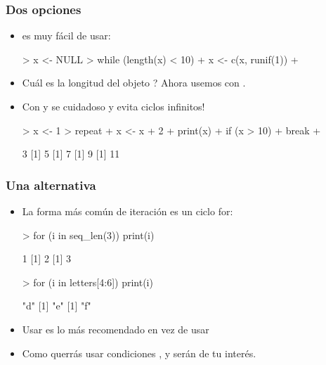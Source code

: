 \begin{frame}
  \frametitle{Dos opciones}
  \begin{itemize}
  \item {} es muy f\'acil de usar: 
\begin{Schunk}
\begin{Sinput}
> x <- NULL
> while (length(x) < 10) {
+     x <- c(x, runif(1))
+ }
\end{Sinput}
\end{Schunk}
  \item \textquestiondown Cu\'al es la longitud del objeto ? Ahora usemos  con .
  \item Con  y  se cuidadoso y evita \alert{ciclos infinitos!}
\begin{Schunk}
\begin{Sinput}
> x <- 1
> repeat {
+     x <- x + 2
+     print(x)
+     if (x > 10) 
+         break
+ }
\end{Sinput}
\begin{Soutput}
[1] 3
[1] 5
[1] 7
[1] 9
[1] 11
\end{Soutput}
\end{Schunk}
  \end{itemize}
\end{frame}

\begin{frame}
  \frametitle{Una alternativa}
  \begin{itemize}
  \item La forma m\'as com\'un de iteraci\'on es un ciclo \alert{for}: 
\begin{Schunk}
\begin{Sinput}
> for (i in seq_len(3)) print(i)
\end{Sinput}
\begin{Soutput}
[1] 1
[1] 2
[1] 3
\end{Soutput}
\begin{Sinput}
> for (i in letters[4:6]) print(i)
\end{Sinput}
\begin{Soutput}
[1] "d"
[1] "e"
[1] "f"
\end{Soutput}
\end{Schunk}
  \item Usar  es lo m\'as recomendado en vez de usar 
  \item Como querr\'as usar condiciones ,  y  ser\'an de tu inter\'es.
  \end{itemize}
\end{frame}

